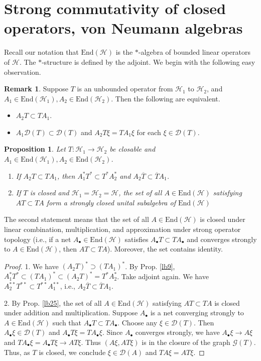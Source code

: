 \documentclass[12pt,b5paper,notitlepage]{article}
\theoremstyle{definition}
\newtheorem{rem}[df]{Remark}
\theoremstyle{plain}
\newtheorem{pp}[df]{Proposition}
\newcommand{\mc}{\mathcal}
\newcommand{\ovl}{\overline}
\newcommand{\End}{\mathrm{End}} %
\newcommand{\Dom}{\scr D}
\newcommand{\scr}{\mathscr}
\newcommand{\blt}{\bullet}
\numberwithin{equation}{section}
\begin{document}
\section{Strong commutativity of closed operators, von Neumann algebras}\label{lb67}



Recall our notation that $\End(\mc H)$ is the $*$-algebra of bounded linear operators of $\mc H$. The $*$-structure is defined by the adjoint. We begin with the following easy observation.

\begin{rem}
Suppose $T$ is an unbounded operator from $\mc H_1$ to $\mc H_2$, and $A_1\in\End(\mc H_1),A_2\in\End(\mc H_2)$. Then the following are equivalent.
\begin{itemize}
\item $A_2T\subset TA_1$.
\item $A_1\Dom(T)\subset \Dom(T)$ and $A_2T\xi=TA_1\xi$ for each $\xi\in\Dom(T)$. 
\end{itemize}
\end{rem}

\begin{pp}\label{lb26}
Let $T:\mc H_1\rightarrow\mc H_2$ be closable and $A_1\in\End(\mc H_1),A_2\in\End(\mc H_2)$.
\begin{enumerate}
\item If $A_2T\subset TA_1$, then $A_1^*T^*\subset T^*A_2^*$ and $A_2\ovl T\subset \ovl T A_1$.
\item If $T$ is closed and $\mc H_1=\mc H_2=\mc H$, the set of all $A\in\End(\mc H)$ satisfying $AT\subset TA$ form a strongly closed unital subalgebra of $\End(\mc H)$
\end{enumerate}
\end{pp}



The second statement means that the set of all $A\in\End(\mc H)$ is closed under linear combination, multiplication, and approximation under strong operator topology (i.e., if a net $A_\blt\in \End(\mc H)$ satisfies $A_\blt T\subset TA_\blt$ and converges strongly to $A\in\End(\mc H)$, then $AT\subset TA$). Moreover, the set contains identity.

\begin{proof}
1. We have $(A_2T)^*\supset (TA_1)^*$. By Prop. \ref{lb9}, $A_1^*T^*\subset (TA_1)^*\subset (A_2T)^*=T^*A_2^*$. Take adjoint again. We have $A_2^{**}T^{**}\subset T^{**}A_1^{**}$, i.e., $A_2\ovl{T}\subset\ovl{T}A_1$.

2. By Prop. \ref{lb25}, the set of all $A\in\End(\mc H)$ satisfying $AT\subset TA$ is closed under addition and multiplication. Suppose $A_\blt$ is a net converging strongly to $A\in\End(\mc H)$ such that $A_\blt T\subset TA_\blt$. Choose any $\xi\in\Dom(T)$. Then $A_\blt\xi\in\Dom(T)$ and $A_\blt T\xi=TA_\blt\xi$. Since $A_\blt$ converges strongly, we have $A_\blt\xi\rightarrow A\xi$  and $TA_\blt\xi=A_\blt T\xi\rightarrow AT\xi$. Thus $(A\xi,AT\xi)$ is in the closure of the graph $\scr G(T)$. Thus, as $T$ is closed, we conclude $\xi\in\Dom(A)$ and $TA\xi=AT\xi$.
\end{proof}
\end{document}
